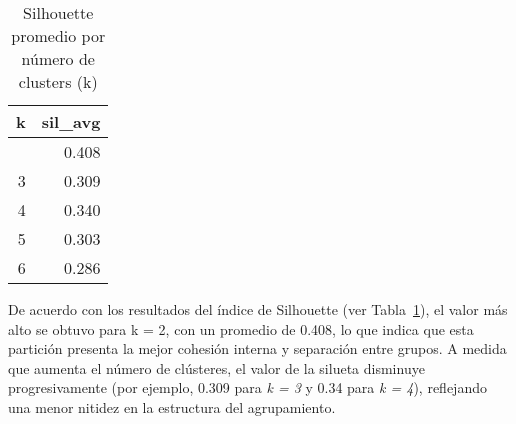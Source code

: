 \documentclass[
  spanish,
  11pt,
  a4paper,
  DIV=11,
  numbers=noendperiod]{scrartcl}
\newenvironment{Shaded}{\begin{snugshade}}{\end{snugshade}}
\newcommand{\AttributeTok}[1]{\textcolor[rgb]{0.40,0.45,0.13}{#1}}
\newcommand{\CommentTok}[1]{\textcolor[rgb]{0.37,0.37,0.37}{#1}}
\newcommand{\ConstantTok}[1]{\textcolor[rgb]{0.56,0.35,0.01}{#1}}
\newcommand{\ControlFlowTok}[1]{\textcolor[rgb]{0.00,0.23,0.31}{\textbf{#1}}}
\newcommand{\DecValTok}[1]{\textcolor[rgb]{0.68,0.00,0.00}{#1}}
\newcommand{\FunctionTok}[1]{\textcolor[rgb]{0.28,0.35,0.67}{#1}}
\newcommand{\NormalTok}[1]{\textcolor[rgb]{0.00,0.23,0.31}{#1}}
\newcommand{\OtherTok}[1]{\textcolor[rgb]{0.00,0.23,0.31}{#1}}
\newcommand{\SpecialCharTok}[1]{\textcolor[rgb]{0.37,0.37,0.37}{#1}}
\newcommand{\StringTok}[1]{\textcolor[rgb]{0.13,0.47,0.30}{#1}}
\begin{document}
\begin{Shaded}
\end{Shaded}

\begin{longtable}[]{@{}rr@{}}

\caption{\label{tbl-clust-k}Silhouette promedio por número de clusters
(k)}

\tabularnewline

\toprule\noalign{}
k & sil\_avg \\
\midrule\noalign{}
\endhead
\bottomrule\noalign{}
\endlastfoot
2 & 0.408 \\
3 & 0.309 \\
4 & 0.340 \\
5 & 0.303 \\
6 & 0.286 \\

\end{longtable}

De acuerdo con los resultados del índice de Silhouette (ver
Tabla~\ref{tbl-clust-k}), el valor más alto se obtuvo para k = 2, con un
promedio de 0.408, lo que indica que esta partición presenta la mejor
cohesión interna y separación entre grupos. A medida que aumenta el
número de clústeres, el valor de la silueta disminuye progresivamente
(por ejemplo, 0.309 para \emph{k = 3} y 0.34 para \emph{k = 4}),
reflejando una menor nitidez en la estructura del agrupamiento.
\end{document}
